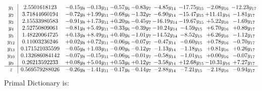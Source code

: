 \documentclass[9pt]{article}
\begin{document}
\[\begin{array}{c| c c@{\hskip 2pt} c@{\hskip 2pt} c@{\hskip 2pt} c@{\hskip 2pt} c@{\hskip 2pt} c@{\hskip 2pt} c@{\hskip 2pt} c@{\hskip 2pt} }
 y_{1}   &  2.5501618123 & -0.15 y_{8} & -0.13 y_{11} & -0.57 y_{6} & -0.83 y_{7} & -4.85 y_{14} & -17.75 y_{15} & -2.08 y_{16} & -12.23 y_{17}\\
 y_{2}   &  3.71844660194 & -0.72 y_{8} & +  1.99 y_{11} & -0.68 y_{6} & -1.32 y_{7} & -6.90 y_{14} & -15.47 y_{15} & + 11.41 y_{16} & -1.81 y_{17}\\
 y_{3}   &  2.15533980583 & -0.91 y_{8} & +  1.73 y_{11} & +  0.20 y_{6} & -0.45 y_{7} & -16.19 y_{14} & -19.67 y_{15} & +  5.22 y_{16} & -1.69 y_{17}\\
 y_{4}   &  2.52750809061 & -0.81 y_{8} & +  5.49 y_{11} & -0.33 y_{6} & -0.39 y_{7} & -10.24 y_{14} & -4.59 y_{15} & +  6.70 y_{16} & +  0.89 y_{17}\\
 y_{5}   &  1.48220064725 & +  0.13 y_{8} & +  8.49 y_{11} & +  0.40 y_{6} & -1.01 y_{7} & -14.52 y_{14} & -8.52 y_{15} & +  6.26 y_{16} & -1.12 y_{17}\\
 y_{12}   &  0.11003236246 & +  0.02 y_{8} & +  0.72 y_{11} & -0.06 y_{6} & -0.07 y_{7} & -0.47 y_{14} & -0.60 y_{15} & +  0.78 y_{16} & -0.70 y_{17}\\
 y_{13}   &  0.171521035599 & -0.05 y_{8} & +  1.03 y_{11} & -0.00 y_{6} & -0.12 y_{7} & -1.13 y_{14} & -1.18 y_{15} & +  0.81 y_{16} & +  0.26 y_{17}\\
 y_{10}   &  0.132686084142 & -0.07 y_{8} & -0.15 y_{11} & -0.06 y_{6} & -0.01 y_{7} & -0.58 y_{14} & -1.01 y_{15} & +  0.00 y_{16} & -0.07 y_{17}\\
 y_{9}   &  0.26213592233 & +  0.08 y_{8} & +  5.04 y_{11} & +  0.53 y_{6} & +  0.12 y_{7} & -3.58 y_{14} & + 12.68 y_{15} & -10.31 y_{16} & +  7.27 y_{17}\\
\hline
z    &  0.569579288026 & -0.26 y_{8} & -1.41 y_{11} & -0.17 y_{6} & -0.14 y_{7} & -2.88 y_{14} & -7.21 y_{15} & -2.18 y_{16} & -0.94 y_{17}\\
\end{array}\]
Primal Dictionary is:
\end{document}
